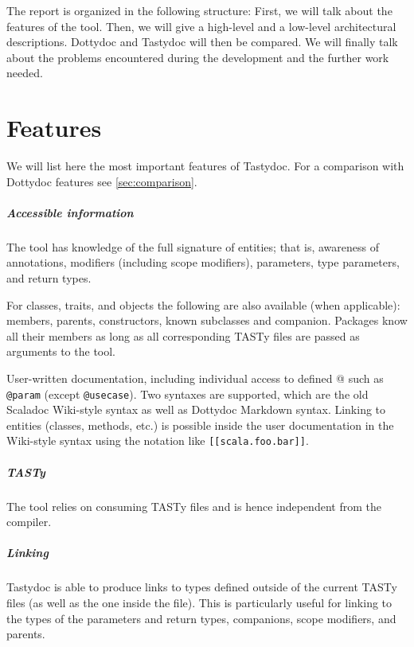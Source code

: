 \documentclass{report}
\begin{document}
The report is organized in the following structure: First, we will talk about the features of the tool. Then, we will give a high-level and a low-level architectural descriptions. Dottydoc and Tastydoc will then be compared. We will finally talk about the problems encountered during the development and the further work needed.

\chapter{Features}
We will list here the most important features of Tastydoc. For a comparison with Dottydoc features see \autoref{sec:comparison}.

\paragraph{Accessible information}
The tool has knowledge of the full signature of entities; that is, awareness of annotations, modifiers (including scope modifiers), parameters, type parameters, and return types.

For classes, traits, and objects the following are also available (when applicable): members, parents, constructors, known subclasses and companion.
Packages know all their members as long as all corresponding TASTy files are passed as arguments to the tool.

User-written documentation, including individual access to defined @ such as \texttt{@param} (except \texttt{@usecase}). Two syntaxes are supported, which are the old Scaladoc Wiki-style syntax as well as Dottydoc Markdown syntax. Linking to entities (classes, methods, etc.) is possible inside the user documentation in the Wiki-style syntax using the notation like \texttt{[[scala.foo.bar]]}.

\paragraph{TASTy}
The tool relies on consuming TASTy files and is hence independent from the compiler.

\paragraph{Linking}
Tastydoc is able to produce links to types defined outside of the current TASTy files (as well as the one inside the file). This is particularly useful for linking to the types of the parameters and return types, companions, scope modifiers, and parents.
\end{document}
